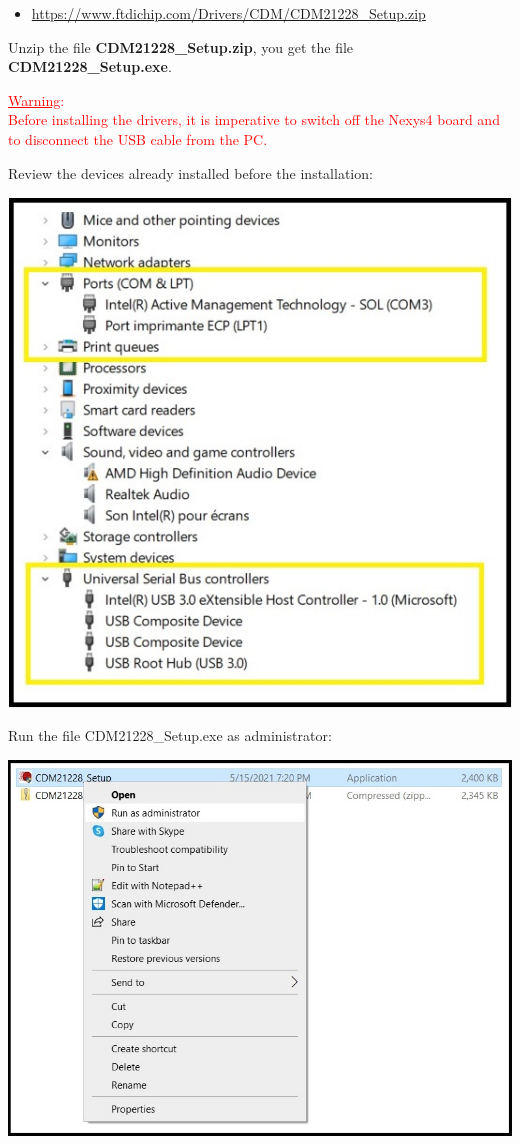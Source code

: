 \begin{itemize}
  \item \url{https://www.ftdichip.com/Drivers/CDM/CDM21228\_Setup.zip}
\end{itemize}

Unzip the file \textbf{CDM21228\_Setup.zip}, you get the file \textbf{CDM21228\_Setup.exe}.

\textcolor{red}{\underline{Warning}: \\
Before installing the drivers, it is imperative to switch off the Nexys4 board and to disconnect the USB cable from the PC.}

\begin{minipage}{\linewidth}
  Review the devices already installed before the installation:
  \\
  \begin{center}
    \includegraphics[width=0.6\linewidth]{images/img001_install_drivers_00.jpg}
  \end{center}
\end{minipage}

\begin{minipage}{\linewidth}
  Run the file CDM21228\_Setup.exe as administrator:
  \\
  \begin{center}
    \includegraphics[width=0.6\linewidth]{images/img001_install_drivers_01.jpg}
  \end{center}
\end{minipage}

